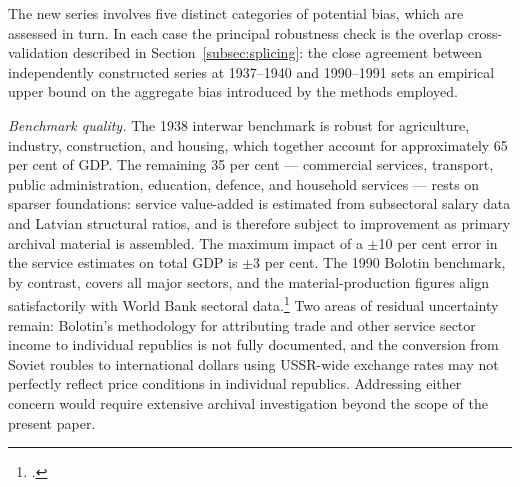 \documentclass[12pt,a4paper]{article}
\begin{document}
The new series involves five distinct categories of potential bias, which are assessed in turn. In each case the principal robustness check is the overlap cross-validation described in Section~\ref{subsec:splicing}: the close agreement between independently constructed series at 1937--1940 and 1990--1991 sets an empirical upper bound on the aggregate bias introduced by the methods employed.

\textit{Benchmark quality.} The 1938 interwar benchmark is robust for agriculture, industry, construction, and housing, which together account for approximately 65 per cent of GDP. The remaining 35 per cent — commercial services, transport, public administration, education, defence, and household services — rests on sparser foundations: service value-added is estimated from subsectoral salary data and Latvian structural ratios, and is therefore subject to improvement as primary archival material is assembled. The maximum impact of a $\pm$10 per cent error in the service estimates on total GDP is $\pm$3 per cent. The 1990 Bolotin benchmark, by contrast, covers all major sectors, and the material-production figures align satisfactorily with World Bank sectoral data.\footnote{\autocite{wbstatisticalhandbook1994}.} Two areas of residual uncertainty remain: Bolotin's methodology for attributing trade and other service sector income to individual republics is not fully documented, and the conversion from Soviet roubles to international dollars using USSR-wide exchange rates may not perfectly reflect price conditions in individual republics. Addressing either concern would require extensive archival investigation beyond the scope of the present paper.
\end{document}
